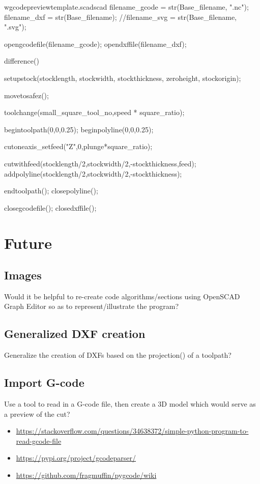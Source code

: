 \documentclass{ltxdoc}
\begin{document}
\begin{writecode}{w}{gcodepreviewtemplate.scad}{scad}
filename_gcode = str(Base_filename, ".nc");
filename_dxf = str(Base_filename);
//filename_svg = str(Base_filename, ".svg");

opengcodefile(filename_gcode);
opendxffile(filename_dxf);

difference() {
setupstock(stocklength, stockwidth, stockthickness, zeroheight, stockorigin);

movetosafez();

toolchange(small_square_tool_no,speed * square_ratio);

begintoolpath(0,0,0.25);
beginpolyline(0,0,0.25);

cutoneaxis_setfeed("Z",0,plunge*square_ratio);

cutwithfeed(stocklength/2,stockwidth/2,-stockthickness,feed);
addpolyline(stocklength/2,stockwidth/2,-stockthickness);

endtoolpath();
closepolyline();
}

closegcodefile();
closedxffile();
\end{writecode}
\addtocounter{gcptmpl}{112}
 
\section{Future}

\subsection{Images}

Would it be helpful to re-create code algorithms/sections using OpenSCAD Graph Editor 
so as to represent/illustrate the program?

\subsection{Generalized DXF creation}

Generalize the creation of DXFs based on the projection() of a toolpath?

\subsection{Import G-code}

Use a tool to read in a G-code file, then create a 3D model which would serve as a preview of the cut?

\begin{itemize}
\item \url{https://stackoverflow.com/questions/34638372/simple-python-program-to-read-gcode-file}
\item \url{https://pypi.org/project/gcodeparser/}
\item \url{https://github.com/fragmuffin/pygcode/wiki}
\end{itemize} 
 
\end{document}
